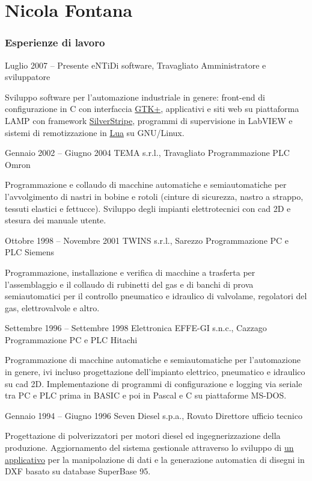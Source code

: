 \documentclass[fontsize=10pt]{tccv}
\begin{document}
\part{Nicola Fontana}

\section{Esperienze di lavoro}

\begin{eventlist}

\item{Luglio 2007 -- Presente}
     {eNTiDi software, Travagliato}
     {Amministratore e sviluppatore}

Sviluppo software per l'automazione industriale in genere:
front-end di configurazione in C con interfaccia
\href{http://www.gtk.org/}{GTK+}, applicativi e siti web su piattaforma
LAMP con framework \href{http://www.silverstripe.org/}{SilverStripe},
programmi di supervisione in LabVIEW e sistemi di remotizzazione in
\href{http://www.lua.org/}{Lua} su GNU/Linux.

\item{Gennaio 2002 -- Giugno 2004}
     {TEMA s.r.l., Travagliato}
     {Programmazione PLC Omron}

Programmazione e collaudo di macchine automatiche e
semiautomatiche per l'avvolgimento di nastri in bobine e rotoli (cinture
di sicurezza, nastro a strappo, tessuti elastici e fettucce). Sviluppo
degli impianti elettrotecnici con cad 2D e stesura dei manuale
utente.

\item{Ottobre 1998 -- Novembre 2001}
     {TWINS s.r.l., Sarezzo}
     {Programmazione PC e PLC Siemens}

Programmazione, installazione e verifica di macchine a
trasferta per l'assemblaggio e il collaudo di rubinetti del gas e di
banchi di prova semiautomatici per il controllo pneumatico e idraulico
di valvolame, regolatori del gas, elettrovalvole e altro.

\item{Settembre 1996 -- Settembre 1998}
     {Elettronica EFFE-GI s.n.c., Cazzago}
     {Programmazione PC e PLC Hitachi}

Programmazione di macchine automatiche e semiautomatiche per
l'automazione in genere, ivi incluso progettazione dell'impianto
elettrico, pneumatico e idraulico su cad 2D. Implementazione di
programmi di configurazione e logging via seriale tra PC e PLC prima in
BASIC e poi in Pascal e C su piattaforme MS-DOS.

\item{Gennaio 1994 -- Giugno 1996}
     {Seven Diesel s.p.a., Rovato}
     {Direttore ufficio tecnico}

Progettazione di polverizzatori per motori diesel ed ingegnerizzazione
della produzione. Aggiornamento del sistema gestionale attraverso lo
sviluppo di \href{http://adg.entidi.com/home/history/}{un applicativo}
per la manipolazione di dati e la generazione automatica di disegni in
DXF basato su database SuperBase 95.

\end{eventlist}
\end{document}
